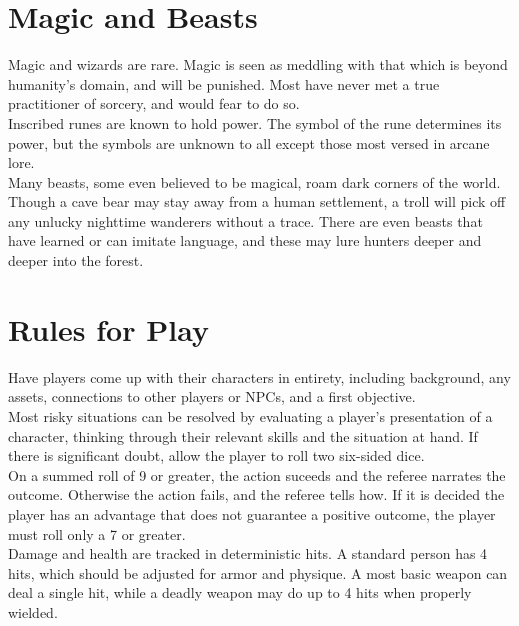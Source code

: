 \documentclass{article}
\begin{document}
\begin{multicols}{2}
\section{Magic and Beasts}

Magic and wizards are rare. Magic is seen as meddling with that which is beyond humanity's domain, and will be punished. Most have never met a true practitioner of sorcery, and would fear to do so. \\

Inscribed runes are known to hold power. The symbol of the rune determines its power, but the symbols are unknown to all except those most versed in arcane lore. \\

Many beasts, some even believed to be magical, roam dark corners of the world. Though a cave bear may stay away from a human settlement, a troll will pick off any unlucky nighttime wanderers without a trace. There are even beasts that have learned or can imitate language, and these may lure hunters deeper and deeper into the forest. \\

\appendix
\section{Rules for Play}

Have players come up with their characters in entirety, including background, any assets, connections to other players or NPCs, and a first objective. \\

Most risky situations can be resolved by evaluating a player's presentation of a character, thinking through their relevant skills and the situation at hand. If there is significant doubt, allow the player to roll two six-sided dice. \\

On a summed roll of 9 or greater, the action suceeds and the referee narrates the outcome. Otherwise the action fails, and the referee tells how. If it is decided the player has an advantage that does not guarantee a positive outcome, the player must roll only a 7 or greater. \\

Damage and health are tracked in deterministic hits. A standard person has 4 hits, which should be adjusted for armor and physique. A most basic weapon can deal a single hit, while a deadly weapon may do up to 4 hits when properly wielded.


\end{multicols}
\end{document}
